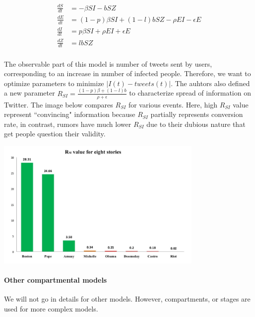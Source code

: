 \begin{align}
    \frac{dS}{dt} &= - \beta SI - bSZ\\
    \frac{dE}{dt} &= (1-p)\beta SI + (1-l)bSZ - \rho EI - \epsilon E\\
    \frac{dI}{dt} &= p\beta S I + \rho E I + \epsilon E \\
    \frac{dZ}{dt} &= lbSZ \\
\end{align}{}

The observable part of this model is number of tweets sent by users, corresponding to an increase in number of infected people. Therefore, we want to optimize parameters to minimize $|I(t) - tweets(t)|$. The auhtors also defined a new parameter $R_{SI} = \frac{(1-p)\beta + (1-l)b}{\rho + \epsilon}$ to characterize spread of information on Twitter. The image below compares $R_{SI}$ for various events. Here, high $R_{SI}$ value represent ``convincing" information because $R_{SI}$ partially represents conversion rate, in contrast, rumors have much lower $R_{SI}$ due to their dubious nature that get people question their validity.

{
\centering
\includegraphics[width=0.75\textwidth]{notes/img/n3_seiz_compare.jpg} \par
}

\paragraph{Other compartmental models} We will not go in details for other models. However, compartments, or stages are used for more complex models.

